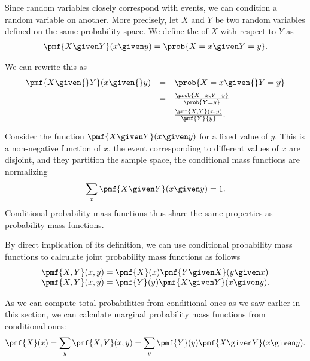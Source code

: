 \begin{cluster}
\label{grp:grm:probability::randvar::conditional-probability-mass-function}

\begin{gram}
\label{grm:probability::randvar::conditional-probability-mass-function}
Since random variables closely correspond with events, we can
condition a random variable on another.
More precisely, let $X$ and $Y$ be two random variables defined on the
same probability space.
We define the  of $X$ with
respect to $Y$ as 
\[
\begin{array}{l}
\pmf{X \given Y}(x \given y) = \prob{X = x \given Y = y}.
\end{array}
\] 

We can rewrite this as 
\[
\begin{array}{lll}
\pmf{X \given{} Y}(x \given{} y) 
& = & \prob{X = x \given{} Y = y}
\\[2mm]
& = & \frac{\prob{X = x, Y = y}}{\prob{Y = y}}
\\[2mm]
& = & \frac{\pmf{X,Y}(x,y)}{\pmf{Y}{y}}.
\end{array}
\] 

\end{gram}
\end{cluster}

\begin{cluster}
\label{grp:grm:probability::randvar::conditional-pmfs-are-pmfs}

\begin{gram}
\label{grm:probability::randvar::conditional-pmfs-are-pmfs}
Consider the function $\pmf{X \given Y}(x \given y)$ for a fixed value
of $y$.  This is a non-negative function of $x$, the event
corresponding to different values of $x$ are disjoint, and they
partition the sample space, the conditional mass functions are
normalizing
\[
\sum_{x}{\pmf{X \given Y}(x \given y)} = 1. 
\]
Conditional probability mass functions thus share the same properties
as probability mass functions.

By direct implication of its definition, we can use conditional
probability mass functions to calculate joint probability mass
functions as follows
\[
\begin{array}{lll}
\pmf{X,Y}(x,y) = \pmf{X}(x) \pmf{Y \given X}(y \given x)
\\
\pmf{X,Y}(x,y) = \pmf{Y}(y) \pmf{X \given Y}(x \given y).
\end{array}
\]

As we can compute total probabilities from conditional ones as we saw
earlier in this section, we can calculate marginal probability
mass functions from conditional ones:
\[
\pmf{X}(x) = \sum_{y}{\pmf{X,Y}(x,y)} = \sum_{y}{\pmf{Y}(y)\pmf{X \given Y}(x \given y)}.
\]

\end{gram}
\end{cluster}


